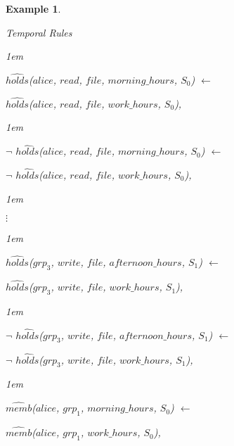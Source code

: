 \documentclass[11pt]{report}
\newtheorem{vexample}{Example}[chapter]
\newenvironment{vquote}
{
  \begin{list}{}{\leftmargin 1em}\item[]
}
{
  \end{list}
}
\begin{document}
\begin{vexample}
\begin{enumerate}
            \item
              Temporal Rules

              \begin{vquote}
                $\hat{holds}$($alice$, $read$, $file$, $morning\_hours$, $S_0$) $\leftarrow$

                \hspace{1em}
                $\hat{holds}$($alice$, $read$, $file$, $work\_hours$, $S_0$),
              \end{vquote}

              \begin{vquote}
                $\lnot$ $\hat{holds}$($alice$, $read$, $file$, $morning\_hours$, $S_0$) $\leftarrow$

                \hspace{1em}
                $\lnot$ $\hat{holds}$($alice$, $read$, $file$, $work\_hours$, $S_0$),
              \end{vquote}

              \begin{vquote}
                \hspace{1em}
                $\vdots$
              \end{vquote}

              \begin{vquote}
                $\hat{holds}$($grp_3$, $write$, $file$, $afternoon\_hours$, $S_1$) $\leftarrow$

                \hspace{1em}
                $\hat{holds}$($grp_3$, $write$, $file$, $work\_hours$, $S_1$),
              \end{vquote}

              \begin{vquote}
                $\lnot$ $\hat{holds}$($grp_3$, $write$, $file$, $afternoon\_hours$, $S_1$) $\leftarrow$

                \hspace{1em}
                $\lnot$ $\hat{holds}$($grp_3$, $write$, $file$, $work\_hours$, $S_1$),
              \end{vquote}

              \begin{vquote}
                $\hat{memb}$($alice$, $grp_1$, $morning\_hours$, $S_0$) $\leftarrow$

                \hspace{1em}
                $\hat{memb}$($alice$, $grp_1$, $work\_hours$, $S_0$),
              \end{vquote}


\end{enumerate}
\end{vexample}
\end{document}
